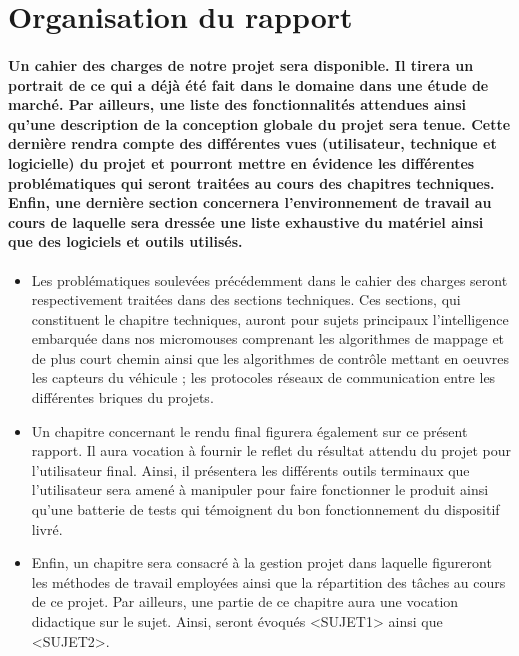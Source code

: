 \section{Organisation du rapport} \label{sec:organisation}

\paragraph{
	Un cahier des charges de notre projet sera disponible. Il tirera un portrait 
de ce qui a déjà été fait dans le domaine dans une étude de marché. Par ailleurs, 
une liste des fonctionnalités attendues ainsi qu'une description de la conception 
globale du projet sera tenue. Cette dernière rendra compte des différentes vues 
(utilisateur, technique et logicielle) du projet et pourront mettre en évidence les 
différentes problématiques qui seront traitées au cours des chapitres techniques. 
Enfin, une dernière section concernera l'environnement de travail au cours de laquelle 
sera dressée une liste exhaustive du matériel ainsi que des logiciels et outils utilisés.}

\vspace{5mm}
\begin{itemize}
	\item Les problématiques soulevées précédemment dans le cahier des charges seront 
respectivement traitées dans des sections techniques. Ces sections, qui constituent 
le chapitre techniques, auront pour sujets principaux l'intelligence embarquée dans 
nos micromouses comprenant les algorithmes de mappage et de plus court chemin ainsi 
que les algorithmes de contrôle mettant en oeuvres les capteurs du véhicule ; les protocoles 
réseaux de communication entre les différentes briques du projets. \\


	\item Un chapitre concernant le rendu final figurera également sur ce présent rapport. 
Il aura vocation à fournir le reflet du résultat attendu du projet pour l'utilisateur 
final. Ainsi, il présentera les différents outils terminaux que l'utilisateur sera amené 
à manipuler pour faire fonctionner le produit ainsi qu'une batterie de tests qui témoignent 
du bon fonctionnement du dispositif livré. \\


	\item Enfin, un chapitre sera consacré à la gestion projet dans laquelle figureront les méthodes 
de travail employées ainsi que la répartition des tâches au cours de ce projet. 
Par ailleurs, une partie de ce chapitre aura une vocation didactique sur le sujet. 
Ainsi, seront évoqués <SUJET1> ainsi que <SUJET2>. \\
\end{itemize}
